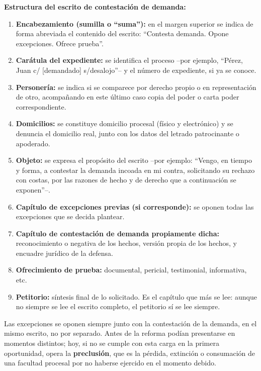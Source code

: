 \documentclass[12pt,oneside]{book}
\begin{document}
\begin{important}
\textbf{Estructura del escrito de contestación de demanda:}
\begin{enumerate}
    \item \textbf{Encabezamiento (sumilla o ``suma''):} en el margen superior se indica de forma abreviada el contenido del escrito: ``Contesta demanda. Opone excepciones. Ofrece prueba''.
    \item \textbf{Carátula del expediente:} se identifica el proceso --por ejemplo, ``Pérez, Juan c/ [demandado] s/desalojo''-- y el número de expediente, si ya se conoce.
    \item \textbf{Personería:} se indica si se comparece por derecho propio o en representación de otro, acompañando en este último caso copia del poder o carta poder correspondiente.
    \item \textbf{Domicilios:} se constituye domicilio procesal (físico y electrónico) y se denuncia el domicilio real, junto con los datos del letrado patrocinante o apoderado.
    \item \textbf{Objeto:} se expresa el propósito del escrito --por ejemplo: ``Vengo, en tiempo y forma, a contestar la demanda incoada en mi contra, solicitando su rechazo con costas, por las razones de hecho y de derecho que a continuación se exponen''--.
    \item \textbf{Capítulo de excepciones previas (si corresponde):} se oponen todas las excepciones que se decida plantear.
    \item \textbf{Capítulo de contestación de demanda propiamente dicha:} reconocimiento o negativa de los hechos, versión propia de los hechos, y encuadre jurídico de la defensa.
    \item \textbf{Ofrecimiento de prueba:} documental, pericial, testimonial, informativa, etc.
    \item \textbf{Petitorio:} síntesis final de lo solicitado. Es el capítulo que más se lee: aunque no siempre se lee el escrito completo, el petitorio sí se lee siempre.
\end{enumerate}
\end{important}

\begin{important}
Las excepciones se oponen siempre junto con la contestación de la demanda, en el mismo escrito, no por separado. Antes de la reforma podían presentarse en momentos distintos; hoy, si no se cumple con esta carga en la primera oportunidad, opera la \textbf{preclusión}, que es la pérdida, extinción o consumación de una facultad procesal por no haberse ejercido en el momento debido.
\end{important}
\end{document}
